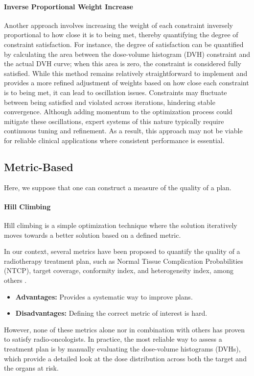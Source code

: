\paragraph{Inverse Proportional Weight Increase}
Another approach involves increasing the weight of each constraint inversely proportional to how close it is to being met, thereby quantifying the degree of constraint satisfaction.
For instance, the degree of satisfaction can be quantified by calculating the area between the dose-volume histogram (DVH) constraint and the actual DVH curve; when this area is zero, the constraint is considered fully satisfied.
While this method remains relatively straightforward to implement and provides a more refined adjustment of weights based on how close each constraint is to being met, it can lead to oscillation issues.
Constraints may fluctuate between being satisfied and violated across iterations, hindering stable convergence.
Although adding momentum to the optimization process could mitigate these oscillations, expert systems of this nature typically require continuous tuning and refinement.
As a result, this approach may not be viable for reliable clinical applications where consistent performance is essential.

\subsection{Metric-Based}
Here, we suppose that one can construct a measure of the quality of a plan.

\paragraph{Hill Climbing}
Hill climbing is a simple optimization technique where the solution iteratively moves towards a better solution based on a defined metric.

In our context, several metrics have been proposed to quantify the quality of a radiotherapy treatment plan, such as Normal Tissue Complication Probabilities (NTCP), target coverage, conformity index, and heterogeneity index, among others \cite{lyman_normal_1992,li_input_2022}\label{metrics}.
\begin{itemize}
	\item \textbf{Advantages:} Provides a systematic way to improve plans.
	\item \textbf{Disadvantages:} Defining the correct metric of interest is hard.
\end{itemize}
However, none of these metrics alone nor in combination with others has proven to satisfy radio-oncologists.
In practice, the most reliable way to assess a treatment plan is by manually evaluating the dose-volume histograms (DVHs), which provide a detailed look at the dose distribution across both the target and the organs at risk.

